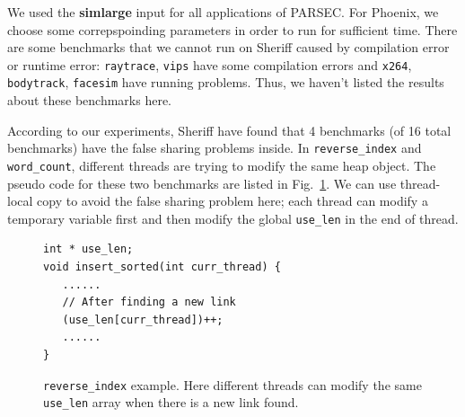We used the \textbf{simlarge} input for all applications of PARSEC. 
For Phoenix, we choose some correpspoinding parameters in 
order to run for sufficient time. 
There are some benchmarks that we cannot run on Sheriff caused by compilation error or runtime error:
\texttt{raytrace}, \texttt{vips} have some compilation errors and \texttt{x264}, \texttt{bodytrack}, \texttt{facesim}
have running problems. Thus, we haven't listed the results about these benchmarks here. 

According to our experiments, Sheriff have found that 4 benchmarks (of 16 total benchmarks) 
have the false sharing problems inside. 
In \texttt{reverse\_index} and \texttt{word\_count}, different threads are trying to 
modify the same heap object. The pseudo code
for these two benchmarks are listed in Fig.~\ref{fig:reverseindex}. 
We can use thread-local copy to avoid the false sharing problem here; each thread can modify a temporary variable
first and then modify the global \texttt{use\_len} in the end of thread. 
\begin{figure}[!t]
\begin{lstlisting}
int * use_len;
void insert_sorted(int curr_thread) {
   ......	
   // After finding a new link
   (use_len[curr_thread])++;
   ......	
}
\end{lstlisting}
\caption{\texttt{reverse\_index} example. Here different threads 
can modify the same \texttt{use\_len} array when
there is a new link found. 
\label{fig:reverseindex}}
\end{figure}

